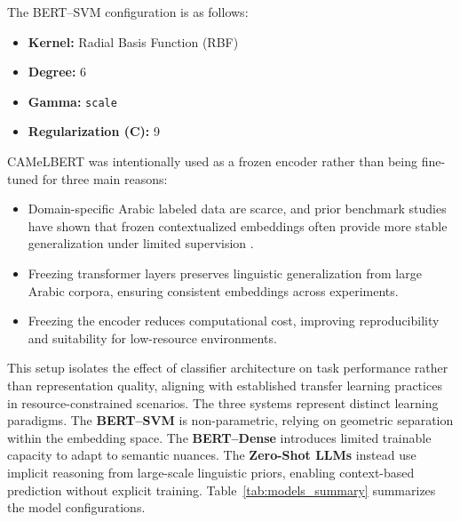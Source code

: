 \documentclass[preprint,12pt,authoryear]{elsarticle}
\begin{document}
\noindent The BERT–SVM configuration is as follows:
\begin{itemize}
    \item \textbf{Kernel:} Radial Basis Function (RBF)
    \item \textbf{Degree:} 6
    \item \textbf{Gamma:} \texttt{scale}
    \item \textbf{Regularization (C):} 9
\end{itemize}

\sloppy
\noindent
CAMeLBERT was intentionally used as a frozen encoder rather than being fine-tuned for three main reasons:
\begin{itemize}
    \item Domain-specific Arabic labeled data are scarce, and prior benchmark studies have shown that frozen contextualized embeddings often provide more stable generalization under limited supervision \cite{AlAyyoub2017, antoun2020,elnagar2023benchmark}.
    \item Freezing transformer layers preserves linguistic generalization from large Arabic corpora, ensuring consistent embeddings across experiments.
    \item Freezing the encoder reduces computational cost, improving reproducibility and suitability for low-resource environments.
\end{itemize}

\sloppy
\noindent
This setup isolates the effect of classifier architecture on task performance rather than representation quality, aligning with established transfer learning practices in resource-constrained scenarios. The three systems represent distinct learning paradigms. The \textbf{BERT–SVM} is non-parametric, relying on geometric separation within the embedding space. The \textbf{BERT–Dense} introduces limited trainable capacity to adapt to semantic nuances. The \textbf{Zero-Shot LLMs} instead use implicit reasoning from large-scale linguistic priors, enabling context-based prediction without explicit training. Table~\ref{tab:models_summary} summarizes the model configurations.
\end{document}
